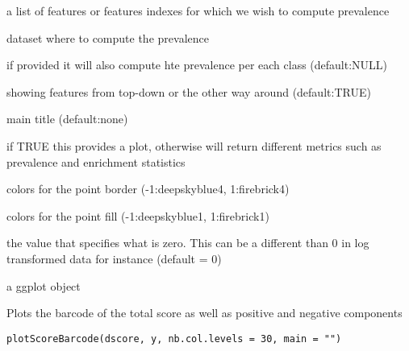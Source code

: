 \documentclass[a4paper]{book}
\begin{document}
\begin{Arguments}
\begin{ldescription}
\item[\code{features:}] a list of features or features indexes for which we wish to compute prevalence

\item[\code{X:}] dataset where to compute the prevalence

\item[\code{y:}] if provided it will also compute hte prevalence per each class (default:NULL)

\item[\code{topdown:}] showing features from top-down or the other way around (default:TRUE)

\item[\code{main:}] main title (default:none)

\item[\code{plot:}] if TRUE this provides a plot, otherwise will return different metrics such as prevalence and enrichment statistics

\item[\code{col.pt:}] colors for the point border (-1:deepskyblue4, 1:firebrick4)

\item[\code{col.bg:}] colors for the point fill (-1:deepskyblue1, 1:firebrick1)

\item[\code{zero.value:}] the value that specifies what is zero. This can be a different than 0 in log transformed data for instance (default = 0)
\end{ldescription}
\end{Arguments}
%
\begin{Value}
a ggplot object
\end{Value}
%
\begin{Description}
Plots the barcode of the total score as well as positive and negative components
\end{Description}
%
\begin{Usage}
\begin{verbatim}
plotScoreBarcode(dscore, y, nb.col.levels = 30, main = "")
\end{verbatim}
\end{Usage}
%
\end{document}

